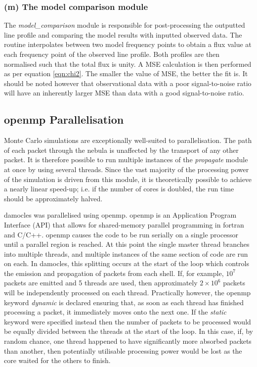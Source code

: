 		\subsubsection{(m) The model comparison module}
		The \textit{model\_comparison} module is responsible for post-processing the outputted line profile and comparing the model results with inputted observed data.  The routine interpolates between two model frequency points to obtain a flux value at each frequency point of the observed line profile.  Both profiles are then normalised such that the total flux is unity.  A MSE calculation is then performed as per equation \ref{eqn:chi2}. The smaller the value of MSE, the better the fit is.  It should be noted however that observational data with a poor signal-to-noise ratio will have an inherently larger MSE than data with a good signal-to-noise ratio.
		
		
		\subsection{{\sc openmp} Parallelisation}	
		\label{scn:open_mp}
		
	Monte Carlo simulations are exceptionally well-suited to parallelisation.  The path of each packet through the nebula is unaffected by the transport of any other packet.  It is therefore possible to run multiple instances of the \textit{propagate} module at once by using several threads.  Since the vast majority of the processing power of the simulation is driven from this module, it is theoretically possible to achieve a nearly linear speed-up; i.e. if the number of cores is doubled, the run time should be approximately halved.  %
	
	{\sc damocles} was parallelised using {\sc openmp}.  {\sc openmp} is an Application Program Interface (API) that allows for shared-memory parallel programming in {\sc fortran} and C/C++.  {\sc openmp} causes the code to be run serially on a single processor until a parallel region is reached.  At this point the single master thread branches into multiple threads, and multiple instances of the same section of code are run on each.  In {\sc damocles}, this splitting occurs at the start of the loop which controls the emission and propagation of packets from each shell.  If, for example, $10^7$ packets are emitted and 5 threads are used, then approximately $2 \times 10^6$ packets will be independently processed on each thread.  Practically however, the {\sc openmp} keyword \textit{dynamic} is declared ensuring that, as soon as each thread has finished processing a packet, it immediately moves onto the next one.  If the \textit{static} keyword were specified instead then the number of packets to be processed would be equally divided between the threads at the start of the loop.  In this case, if, by random chance, one thread happened to have significantly more absorbed packets than another, then potentially utilisable processing power would be lost as the core waited for the others to finish.
	

